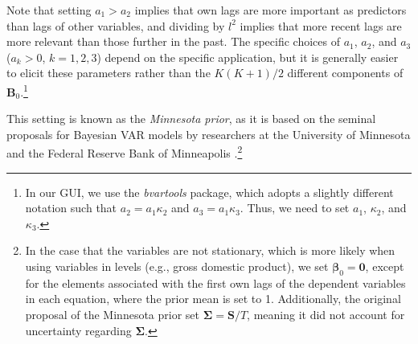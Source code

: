 Note that setting $a_1 > a_2$ implies that own lags are more important as predictors than lags of other variables, and dividing by $l^2$ implies that more recent lags are more relevant than those further in the past. The specific choices of $a_1$, $a_2$, and $a_3$ ($a_k > 0$, $k = 1, 2, 3$) depend on the specific application, but it is generally easier to elicit these parameters rather than the $K(K+1)/2$ different components of $\bm{B}_0$.\footnote{In our GUI, we use the \textit{bvartools} package, which adopts a slightly different notation such that $a_2 = a_1 \kappa_2$ and $a_3 = a_1 \kappa_3$. Thus, we need to set $a_1$, $\kappa_2$, and $\kappa_3$.}

This setting is known as the \textit{Minnesota prior}, as it is based on the seminal proposals for Bayesian VAR models by researchers at the University of Minnesota and the Federal Reserve Bank of Minneapolis \cite{doan1984forecasting, litterman1986forecasting}.\footnote{In the case that the variables are not stationary, which is more likely when using variables in levels (e.g., gross domestic product), we set $\bm{\beta}_0 = \bm{0}$, except for the elements associated with the first own lags of the dependent variables in each equation, where the prior mean is set to 1. Additionally, the original proposal of the Minnesota prior set $\bm{\Sigma} = \bm{S}/T$, meaning it did not account for uncertainty regarding $\bm{\Sigma}$.}


